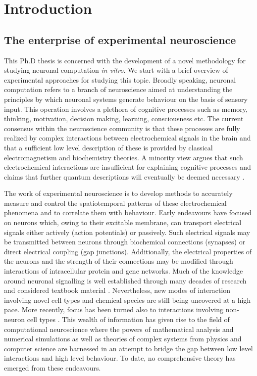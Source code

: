 \chapter{Introduction}
\label{chap:introduction}

    \section{The enterprise of experimental neuroscience}
    \label{sec:introduction:neuroExp}
    This Ph.D thesis is concerned with the development of a novel methodology for studying neuronal computation \textit{in vitro}. We start with a brief overview of experimental approaches for studying this topic. Broadly speaking, neuronal computation refers to a branch of neuroscience aimed at understanding the principles by which neuronal systems generate behaviour on the basis of sensory input. This operation involves a plethora of cognitive processes such as memory, thinking, motivation, decision making, learning, consciousness etc. The current consensus within the neuroscience community is that these processes are fully realized by complex interactions between electrochemical signals in the brain and that a sufficient low level description of these is provided by classical electromagnetism and biochemistry theories. A minority view argues that such electrochemical interactions are insufficient for explaining cognitive processes and claims that further quantum descriptions will eventually be deemed necessary \cite{hameroff2014consciousness,hagan2002quantum}.

    The work of experimental neuroscience is to develop methods to accurately measure and control the spatiotemporal patterns of these electrochemical phenomena and to correlate them with behaviour. Early endeavours have focused on neurons which, owing to their excitable membrane, can transport electrical signals either actively (action potentials) or passively. Such electrical signals may be transmitted between neurons through biochemical connections (synapses) or direct electrical coupling (gap junctions). Additionally, the electrical properties of the neurons and the strength of their connections may be modified through interactions of intracellular protein and gene networks. Much of the knowledge around neuronal signalling is well established through many decades of research and considered textbook material \cite{Kandel}. Nevertheless, new modes of interaction involving novel cell types and chemical species are still being uncovered at a high pace. More recently, focus has been turned also to interactions involving non-neuron cell types \cite{volterra2005astrocytes,olah2009regulation}. This wealth of information has given rise to the field of computational neuroscience where the powers of mathematical analysis and numerical simulations as well as theories of complex systems from physics and computer science are harnessed in an attempt to bridge the gap between low level interactions and high level behaviour. To date, no comprehensive theory has emerged from these endeavours.

